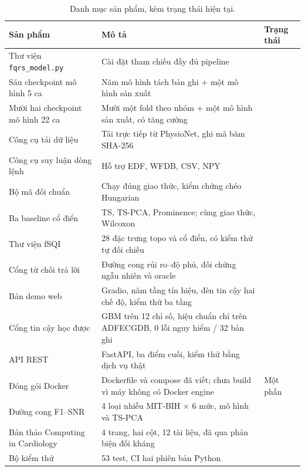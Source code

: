 \begin{table}[H]\centering\small
\caption{Danh mục sản phẩm, kèm trạng thái hiện tại.}
\label{tab:sanpham}
\begin{tabular}{@{}L{5.6cm} L{6.0cm} C{2.6cm}@{}}
\toprule
\textbf{Sản phẩm} & \textbf{Mô tả} & \textbf{Trạng thái} \\
\midrule
Thư viện \texttt{fqrs\_model.py} & Cài đặt tham chiếu đầy đủ pipeline &  \\
Sáu checkpoint mô hình 5 ca & Năm mô hình tách bản ghi + một mô hình sản xuất &  \\
Mười hai checkpoint mô hình 22 ca & Mười một fold theo nhóm + một mô hình sản xuất, có tăng cường &  \\
Công cụ tải dữ liệu & Tải trực tiếp từ PhysioNet, ghi mã băm SHA-256 &  \\
Công cụ suy luận dòng lệnh & Hỗ trợ EDF, WFDB, CSV, NPY &  \\
Bộ mã đối chuẩn & Chạy đúng giao thức, kiểm chứng chéo Hungarian &  \\
Ba baseline cổ điển & TS, TS-PCA, Prominence; cùng giao thức, Wilcoxon &  \\
Thư viện fSQI & 28 đặc trưng topo và cổ điển, có kiểm thử tự đối chiếu &  \\
Cổng từ chối trả lời & Đường cong rủi ro--độ phủ, đối chứng ngẫu nhiên và oracle &  \\
Bản demo web & Gradio, năm tầng tín hiệu, đèn tin cậy hai chế độ, kiểm thử ba tầng &  \\
Cổng tin cậy học được & GBM trên 12 chỉ số, hiệu chuẩn chỉ trên ADFECGDB, 0 lỗi nguy hiểm / 32 bản ghi &  \\
API REST & FastAPI, ba điểm cuối, kiểm thử bằng dịch vụ thật &  \\
Đóng gói Docker & Dockerfile và compose đã viết; chưa build vì máy không có Docker engine & Một phần \\
Đường cong F1--SNR & 4 loại nhiễu MIT-BIH $\times$ 6 mức, mô hình và TS-PCA &  \\
Bản thảo Computing in Cardiology & 4 trang, hai cột, 12 tài liệu, đã qua phản biện đối kháng &  \\
Bộ kiểm thử & 53 test, CI hai phiên bản Python &  \\
\bottomrule
\end{tabular}
\end{table}

